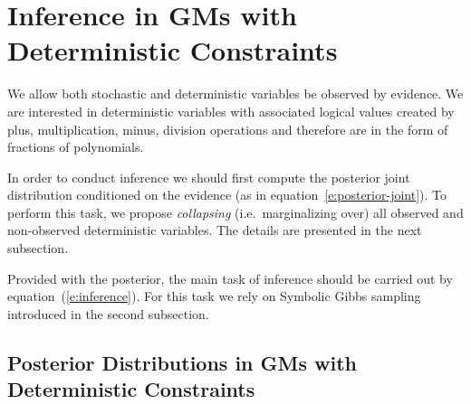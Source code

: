 \documentclass[letterpaper]{article}
\begin{document}
\section{Inference in GMs with Deterministic Constraints}
We allow both stochastic and deterministic variables be observed by evidence.  
We are interested in deterministic variables with associated logical values  
created by plus, multiplication, minus, division operations and therefore 
are in the form of fractions of polynomials.

In order to conduct inference we should first compute 
the posterior joint distribution conditioned on the evidence 
(as in equation~\ref{e:posterior-joint}).
To perform this task, we propose \emph{collapsing} (i.e.\ marginalizing over) all observed and non-observed deterministic variables. The details are presented in the next subsection. 

Provided with the posterior, the main task of inference should be carried out by equation~(\ref{e:inference}).
For this task we rely on Symbolic Gibbs sampling introduced in the second subsection.

\subsection{Posterior Distributions in GMs with Deterministic Constraints}
\end{document}

